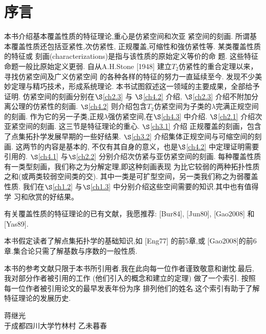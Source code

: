 \chapter*{序\quad 言}

\setcounter{page}{1}
\thispagestyle{empty}

本书介绍基本覆盖性质的特征理论,重心是仿紧空间和次亚
紧空间的刻画.
所谓基本覆盖性质还包括亚紧性,次仿紧性,
正规覆盖,可缩性和強仿紧性等.
某类覆盖性质的特征或
刻画(characterizations)是指与该性质的原始定义等价的命
题.
这些特征命题一般比原始定义更弱.
自从A.H.Stone [1948]
建立$T_2$仿紧性的重合定理以来，寻找仿紧空间及广义仿紧空间
的各种各样的特征的努力一直延续至今.
发现不少美妙定理与精巧技术，形成系统理论.
本书试图叙述这一领域的主要成果，全部给予证明.
仿紧空间的刻画分别在$\S$\ref{ch2.3} 与
$\S$\ref{ch4.2} 介绍, $\S$\ref{ch2.3} 介绍不附加分离公理的仿紧性的刻画.
$\S$\ref{ch4.2} 则介绍包含$T_2$仿紧空间为子类的$\lambda$完满正规空间的刻画.
作为它的另一子类,正规$\lambda$强仿紧空间,在$\S$\ref{ch4.3} 中介绍.
$\S$\ref{ch2.1} 介绍次亚紧空间的刻画.
这三节是特征理论的重心. $\S$\ref{ch3.1} 介绍
正规覆盖的刻画，包含了点集拓扑学发展早期的一些好结果.
$\S$\ref{ch3.2} 介绍集体正规空间与可缩空间的刻画.
这两节的内容是基本的, 不仅有其自身的意义，也是$\S$\ref{ch4.2} 中定理证明需要引用的.
$\S$\ref{ch4.1} 与$\S$\ref{ch2.2} 分别介绍次仿紧与亚仿紧空间的刻画.
每种覆盖性质有一类型刻画，我们称之为分解定理,即这种刻画表现
为比它较弱的两种拓扑性质之和(或两类较弱空间类的交).
其中一类是可扩型空间，另一类我们称之为弱覆盖性质.
我们在$\S$\ref{ch1.2} 与$\S$\ref{ch1.3} 中分别介绍这些空间需要的知识.其中也有值得学
习和欣赏的好结果。

有关覆盖性质的特征理论的已有文献，我愿推荐: [Bur84], [Jun80], [Gao2008] 和 [Yas89].

本书假定读者了解点集拓扑学的基础知识,如 [Eng77] 的前5章,或
[Gao2008]的前6章.集合论只需了解基数与序数的一般性质.

本书的参考文献只限于本书所引用者.我在此向每一位作者谨致敬意和谢忱.最后, 我对部分作者被引用的工作 (他们引入的概念和建立的定理) 做了一个索引.
按照每一位作者被引用论文的最早发表年份为序
排列他们的姓名.这个索引有助于了解特征理论的发展历史.

{\kaishu
	\begin{center}
		\hspace*{88mm}蒋继光\\
		\hspace{88mm}于成都四川大学竹林村
		\hspace*{88mm}乙未暮春
	\end{center}
}


